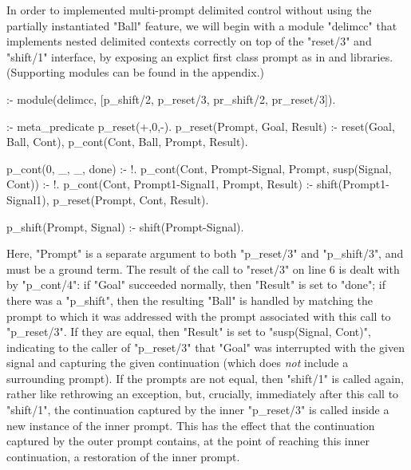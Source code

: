 In order to implemented multi-prompt delimited control without using the partially instantiated
"Ball" feature, we will begin with a module "delimcc" that implements nested delimited contexts
correctly on top of the "reset/3" and "shift/1" interface, by exposing an explict first class prompt
as in  and  libraries. 
(Supporting modules can be found in the appendix.)
\begin{prolog-framed}[name=delimcc]
  :- module(delimcc, [p_shift/2, p_reset/3, pr_shift/2, pr_reset/3]).

  :- meta_predicate p_reset(+,0,-).
  p_reset(Prompt, Goal, Result) :-
     reset(Goal, Ball, Cont),
     p_cont(Cont, Ball, Prompt, Result).

  p_cont(0, _, _, done) :- !.
  p_cont(Cont, Prompt-Signal, Prompt, susp(Signal, Cont)) :- !.
  p_cont(Cont, Prompt1-Signal1, Prompt, Result) :-
     shift(Prompt1-Signal1),
     p_reset(Prompt, Cont, Result).

  p_shift(Prompt, Signal) :- shift(Prompt-Signal).
\end{prolog-framed}
Here, "Prompt" is a separate argument to both "p_reset/3" and "p_shift/3", and must be a
ground term. The result of the call to "reset/3" on line 6 is dealt with by "p_cont/4": if "Goal" succeeded normally,
then "Result" is set to "done"; if there was a "p_shift", then the resulting
"Ball" is handled by matching the prompt to which it was addressed with the prompt associated with
this call to "p_reset/3". If they are equal, then "Result" is set to "susp(Signal, Cont)",
indicating to the caller of "p_reset/3" that "Goal" was interrupted with the given signal
and capturing the given continuation (which does \emph{not} include a surrounding prompt).
If the prompts are not equal, then "shift/1" is called again, rather like rethrowing an exception,
but, crucially, immediately after this call to "shift/1", the continuation captured by the
inner "p_reset/3" is called inside a new instance of the inner prompt. This has the effect that
the continuation captured by the outer prompt contains, at the point of reaching this inner
continuation, a restoration of the inner prompt.

